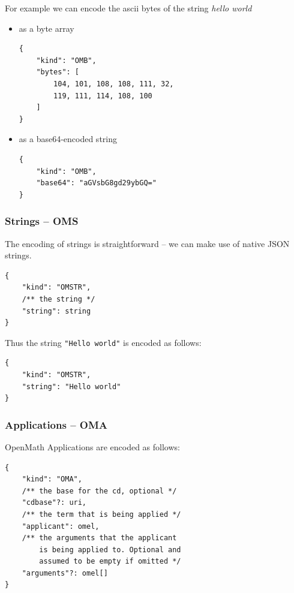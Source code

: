 For example we can encode the ascii bytes of the string \textit{hello world}
\begin{itemize}
    \item as a byte array
\\\begin{minipage}{\linewidth}\begin{lstlisting}
{
    "kind": "OMB",
    "bytes": [
        104, 101, 108, 108, 111, 32, 
        119, 111, 114, 108, 100
    ]
}
\end{lstlisting}\end{minipage}
    \item as a base64-encoded string
\\\begin{minipage}{\linewidth}\begin{lstlisting}
{
    "kind": "OMB",
    "base64": "aGVsbG8gd29ybGQ="
}
\end{lstlisting}\end{minipage}
\end{itemize}

\subsubsection{Strings -- OMS}
The encoding of strings is straightforward -- we can make use of native JSON strings. 
\\\begin{minipage}{\linewidth}\begin{lstlisting}
{
    "kind": "OMSTR", 
    /** the string */
    "string": string
}
\end{lstlisting}\end{minipage}

Thus the string \lstinline{"Hello world"} is encoded as follows:
\\\begin{minipage}{\linewidth}\begin{lstlisting}
{
    "kind": "OMSTR", 
    "string": "Hello world"
}
\end{lstlisting}\end{minipage}

\subsubsection{Applications -- OMA}

OpenMath Applications are encoded as follows:
\\\begin{minipage}{\linewidth}\begin{lstlisting}
{
    "kind": "OMA", 
    /** the base for the cd, optional */
    "cdbase"?: uri, 
    /** the term that is being applied */
    "applicant": omel, 
    /** the arguments that the applicant 
        is being applied to. Optional and
        assumed to be empty if omitted */
    "arguments"?: omel[]
}
\end{lstlisting}\end{minipage}

